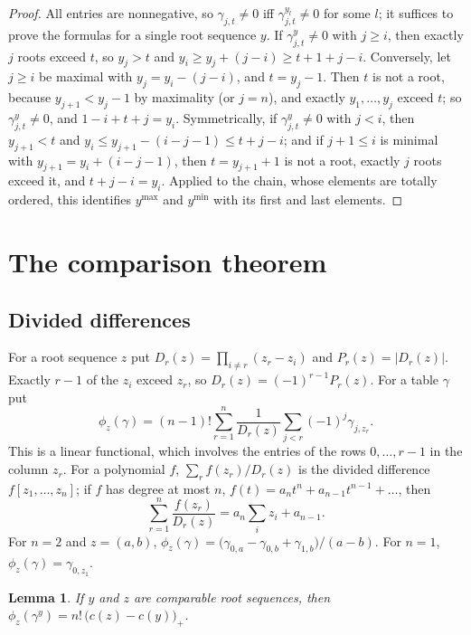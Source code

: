 \documentclass[11pt]{amsart}
\newtheorem{lemma}[theorem]{Lemma}
\theoremstyle{definition}
\theoremstyle{remark}
\begin{document}
\begin{proof}
All entries are nonnegative, so $\gamma_{j,t}\ne0$ iff $\gamma^{y_l}_{j,t}\ne0$ for some $l$; it suffices to prove the formulas for a single root sequence $y$. If $\gamma^y_{j,t}\ne0$ with $j\ge i$, then exactly $j$ roots exceed $t$, so $y_j>t$ and $y_i\ge y_j+(j-i)\ge t+1+j-i$. Conversely, let $j\ge i$ be maximal with $y_j=y_i-(j-i)$, and $t=y_j-1$. Then $t$ is not a root, because $y_{j+1}<y_j-1$ by maximality (or $j=n$), and exactly $y_1,\dots,y_j$ exceed $t$; so $\gamma^y_{j,t}\ne0$, and $1-i+t+j=y_i$. Symmetrically, if $\gamma^y_{j,t}\ne0$ with $j<i$, then $y_{j+1}<t$ and $y_i\le y_{j+1}-(i-j-1)\le t+j-i$; and if $j+1\le i$ is minimal with $y_{j+1}=y_i+(i-j-1)$, then $t=y_{j+1}+1$ is not a root, exactly $j$ roots exceed it, and $t+j-i=y_i$. Applied to the chain, whose elements are totally ordered, this identifies $y^{\max}$ and $y^{\min}$ with its first and last elements.
\end{proof}

\section{The comparison theorem}\label{sec:main}

\subsection{Divided differences}
For a root sequence $z$ put $D_r(z)=\prod_{i\ne r}(z_r-z_i)$ and $P_r(z)=|D_r(z)|$. Exactly $r-1$ of the $z_i$ exceed $z_r$, so $D_r(z)=(-1)^{r-1}P_r(z)$. For a table $\gamma$ put
\begin{equation}\label{eq:phi}
\phi_z(\gamma)=(n-1)!\sum_{r=1}^n\frac{1}{D_r(z)}\sum_{j<r}(-1)^j\gamma_{j,z_r} .
\end{equation}
This is a linear functional, which involves the entries of the rows $0,\dots,r-1$ in the column $z_r$. For a polynomial $f$, $\sum_rf(z_r)/D_r(z)$ is the divided difference $f[z_1,\dots,z_n]$; if $f$ has degree at most $n$, $f(t)=a_nt^n+a_{n-1}t^{n-1}+\dots$, then
\begin{equation}\label{eq:divdiff}
\sum_{r=1}^n\frac{f(z_r)}{D_r(z)}=a_n\sum_iz_i+a_{n-1}.
\end{equation}
For $n=2$ and $z=(a,b)$, $\phi_z(\gamma)=\big(\gamma_{0,a}-\gamma_{0,b}+\gamma_{1,b}\big)/(a-b)$. For $n=1$, $\phi_z(\gamma)=\gamma_{0,z_1}$.

\begin{lemma}\label{lem:comparable}
If $y$ and $z$ are comparable root sequences, then $\phi_z(\gamma^y)=n!\,\big(c(z)-c(y)\big)_+$.
\end{lemma}
\end{document}
